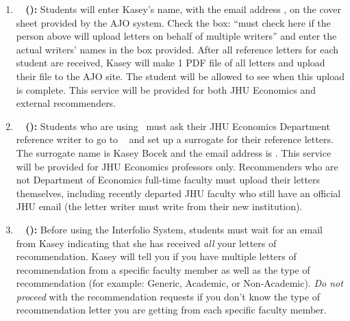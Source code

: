 \documentclass{econtex}
\begin{document}
\begin{enumerate}
\begin{itemize}
\end{itemize}

\item {\bf \AJO ~ (\AJOLink):}
Students will enter Kasey's name, with the email address \JMStaffEmail, on the cover sheet provided by the AJO system. Check the box: ``must check here if the person above will upload letters on behalf of multiple writers'' and enter the actual writers' names in the box provided. After all reference letters for each student are received, Kasey will make 1 PDF file of all letters and upload their file to the AJO site. The student will be allowed to see when this upload is complete. This service will be provided for both JHU Economics and external recommenders.

\item {\bf \AEA ~ (\AEALink):}
Students who are using \AEA~must ask their JHU Economics Department reference writer to go to \AEARecLink~ and set up a surrogate for their reference letters. The surrogate name is Kasey Bocek and the email address is \JMStaffEmail. This service will be provided for JHU Economics professors only. Recommenders who are not Department of Economics full-time faculty must upload their letters themselves, including recently departed JHU faculty who still have an official JHU email (the letter writer must write from their new institution).


\item {\bf \Interfolio ~ (\InterfolioLink):}
Before using the Interfolio System, students must wait for an email from Kasey indicating that she has received {\it all} your letters of recommendation. Kasey will tell you if you have multiple letters of recommendation from a specific faculty member as well as the type of recommendation (for example: Generic, Academic, or Non-Academic). {\it Do not proceed} with the recommendation requests if you don't know the type of recommendation letter you are getting from each specific faculty member.


\end{enumerate}
\end{document}
